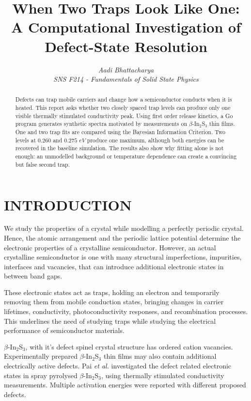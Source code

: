 \documentclass[letterpaper, 10pt, conference]{ieeeconf}
\title{\LARGE \bf When Two Traps Look Like One:\\
A Computational Investigation of Defect-State Resolution}
\author{\textit{Aadi Bhattacharya}\\\textit{SNS F214 - Fundamentals of Solid State Physics}}
\begin{document}
\maketitle
\thispagestyle{empty}
\pagestyle{empty}

\begin{abstract}
Defects can trap mobile carriers and change how a semiconductor conducts when it is heated. This report asks whether two closely spaced trap levels can produce only one visible thermally stimulated conductivity peak. Using first order release kinetics, a Go program generates synthetic spectra motivated by measurements on $\beta$-In$_2$S$_3$ thin films. One and two trap fits are compared using the Bayesian Information Criterion. Two levels at $0.260$ and $0.275$ $eV$ produce one maximum, although both energies can be recovered in the baseline simulation. The results also show why fitting alone is not enough: an unmodelled background or temperature dependence can create a convincing but false second trap.
\end{abstract}

\section{INTRODUCTION}

We study the properties of a crystal while modelling a perfectly periodic crystal. Hence, the atomic arrangement and the periodic lattice potential determine the electronic properties of a crystalline semiconductor. However, an actual crystalline semiconductor is one with many structural imperfections, impurities, interfaces and vacancies, that can introduce additional electronic states in between band gaps.

These electronic states act as traps, holding an electron and temporarily removing them from mobile conduction states, bringing changes in carrier lifetimes, conductivity, photoconductivity responses, and recombination processes. This underlines the need of studying traps while studying the electrical performance of semiconductor materials.

$\beta$-In$_2$S$_3$, with it's defect spinel crystal structure has ordered cation vacancies. Experimentally prepared $\beta$-In$_2$S$_3$ thin films may also contain additional electrically active defects. {Pai \emph{et al.}} \cite{pai} investigated the defect related electronic states in spray pyrolysed $\beta$-In$_2$S$_3$, using thermally stimulated conductivity measurements. Multiple activation energies were reported with different proposed  defects.
\end{document}
